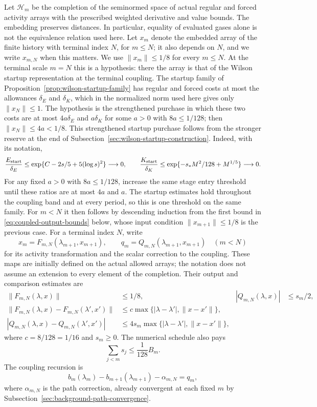 Let $\mathcal H_m$ be the completion of the seminormed space of
actual regular and forced activity arrays with the prescribed
weighted derivative and value bounds. The embedding preserves
distances. In particular, equality of evaluated gases alone is
not the equivalence relation used here. Let $x_m$ denote the
embedded array of the finite history with terminal index $N$, for
$m\le N$; it also depends on $N$, and we write $x_{m,N}$ when this
matters. We use $\|x_m\|\le1/8$ for every $m\le N$. At the terminal
scale $m=N$ this is a hypothesis: there the array is that of the
Wilson startup representation at the terminal coupling. The startup
family of Proposition~\ref{prop:wilson-startup-family} has regular
and forced costs at most the allowances $\delta_E$ and $\delta_K$,
which in the normalized norm used here gives only $\|x_N\|\le1$. The
hypothesis is the strengthened purchase in which these two costs are
at most $4a\delta_E$ and $a\delta_K$ for some $a>0$ with
$8a\le1/128$; then $\|x_N\|\le4a<1/8$. This strengthened startup
purchase follows from the stronger reserve at the end of
Subsection~\ref{sec:wilson-startup-construction}. Indeed, with its notation,
\[
 \frac{E_{\rm start}}{\delta_E}
 \leq\exp\{C-2s/5+5(\log s)^2\}\longrightarrow0,
 \qquad
 \frac{K_{\rm start}}{\delta_K}
 \leq\exp\{-s_*M^2/128+M^{1/5}\}\longrightarrow0.
\]
For any fixed $a>0$ with $8a\leq1/128$, increase the same stage
entry threshold until these ratios are at most $4a$ and $a$.
The startup estimates hold throughout the coupling band and at every
period, so this is one threshold on the same family. For $m<N$ it then follows by descending
induction from the first bound in \eqref{eq:coupled-output-bounds}
below, whose input condition $\|x_{m+1}\|\le1/8$ is the previous
case. For a terminal index $N$, write
\[
 x_m=F_{m,N}(\lambda_{m+1},x_{m+1}),\qquad
 q_m=Q_{m,N}(\lambda_{m+1},x_{m+1})\quad(m<N)
\]
for its activity transformation and the scalar correction to the
coupling. These maps are initially defined on the actual allowed
arrays; the notation does not assume an extension to every element
of the completion. Their output and comparison estimates are
\begin{align}
 \|F_{m,N}(\lambda,x)\|&\le1/8,
 &|Q_{m,N}(\lambda,x)|&\le s_m/2,\label{eq:coupled-output-bounds}\\
 \|F_{m,N}(\lambda,x)-F_{m,N}(\lambda',x')\|
 &\le c\max\{|\lambda-\lambda'|,\|x-x'\|\},\label{eq:coupled-activity-step}\\
 |Q_{m,N}(\lambda,x)-Q_{m,N}(\lambda',x')|
 &\le4s_m\max\{|\lambda-\lambda'|,\|x-x'\|\},\label{eq:coupled-cost-step}
\end{align}
where $c=8/128=1/16$ and $s_m\ge0$. The numerical schedule
also pays
\begin{equation}\label{eq:coupled-cumulative-payment}
                  \sum_{j<m}s_j\le\frac1{128}B_m.
\end{equation}
The coupling recursion is
\begin{equation}\label{eq:coupled-recursion}
 b_m(\lambda_m)-b_{m+1}(\lambda_{m+1})-\alpha_{m,N}=q_m,
\end{equation}
where $\alpha_{m,N}$ is the path correction, already convergent
at each fixed $m$ by Subsection~\ref{sec:background-path-convergence}.

